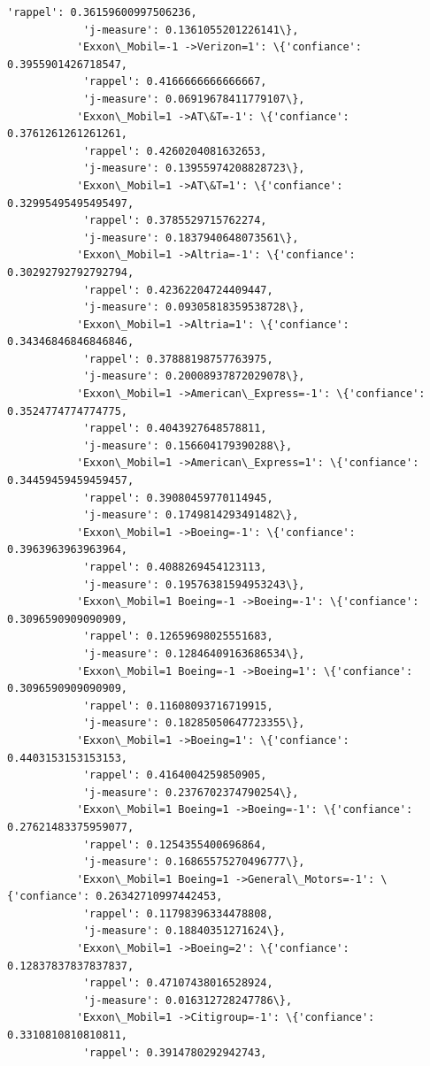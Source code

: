 \documentclass[11pt]{article}
\begin{document}
\begin{Verbatim}[commandchars=\\\{\}]
            'rappel': 0.36159600997506236,
            'j-measure': 0.1361055201226141\},
           'Exxon\_Mobil=-1 ->Verizon=1': \{'confiance': 0.3955901426718547,
            'rappel': 0.4166666666666667,
            'j-measure': 0.06919678411779107\},
           'Exxon\_Mobil=1 ->AT\&T=-1': \{'confiance': 0.3761261261261261,
            'rappel': 0.4260204081632653,
            'j-measure': 0.13955974208828723\},
           'Exxon\_Mobil=1 ->AT\&T=1': \{'confiance': 0.32995495495495497,
            'rappel': 0.3785529715762274,
            'j-measure': 0.1837940648073561\},
           'Exxon\_Mobil=1 ->Altria=-1': \{'confiance': 0.30292792792792794,
            'rappel': 0.42362204724409447,
            'j-measure': 0.09305818359538728\},
           'Exxon\_Mobil=1 ->Altria=1': \{'confiance': 0.34346846846846846,
            'rappel': 0.37888198757763975,
            'j-measure': 0.20008937872029078\},
           'Exxon\_Mobil=1 ->American\_Express=-1': \{'confiance': 0.3524774774774775,
            'rappel': 0.4043927648578811,
            'j-measure': 0.156604179390288\},
           'Exxon\_Mobil=1 ->American\_Express=1': \{'confiance': 0.34459459459459457,
            'rappel': 0.39080459770114945,
            'j-measure': 0.1749814293491482\},
           'Exxon\_Mobil=1 ->Boeing=-1': \{'confiance': 0.3963963963963964,
            'rappel': 0.4088269454123113,
            'j-measure': 0.19576381594953243\},
           'Exxon\_Mobil=1 Boeing=-1 ->Boeing=-1': \{'confiance': 0.3096590909090909,
            'rappel': 0.12659698025551683,
            'j-measure': 0.12846409163686534\},
           'Exxon\_Mobil=1 Boeing=-1 ->Boeing=1': \{'confiance': 0.3096590909090909,
            'rappel': 0.11608093716719915,
            'j-measure': 0.18285050647723355\},
           'Exxon\_Mobil=1 ->Boeing=1': \{'confiance': 0.4403153153153153,
            'rappel': 0.4164004259850905,
            'j-measure': 0.2376702374790254\},
           'Exxon\_Mobil=1 Boeing=1 ->Boeing=-1': \{'confiance': 0.27621483375959077,
            'rappel': 0.1254355400696864,
            'j-measure': 0.16865575270496777\},
           'Exxon\_Mobil=1 Boeing=1 ->General\_Motors=-1': \{'confiance': 0.26342710997442453,
            'rappel': 0.11798396334478808,
            'j-measure': 0.18840351271624\},
           'Exxon\_Mobil=1 ->Boeing=2': \{'confiance': 0.12837837837837837,
            'rappel': 0.47107438016528924,
            'j-measure': 0.016312728247786\},
           'Exxon\_Mobil=1 ->Citigroup=-1': \{'confiance': 0.3310810810810811,
            'rappel': 0.3914780292942743,

\end{Verbatim}
\end{document}
